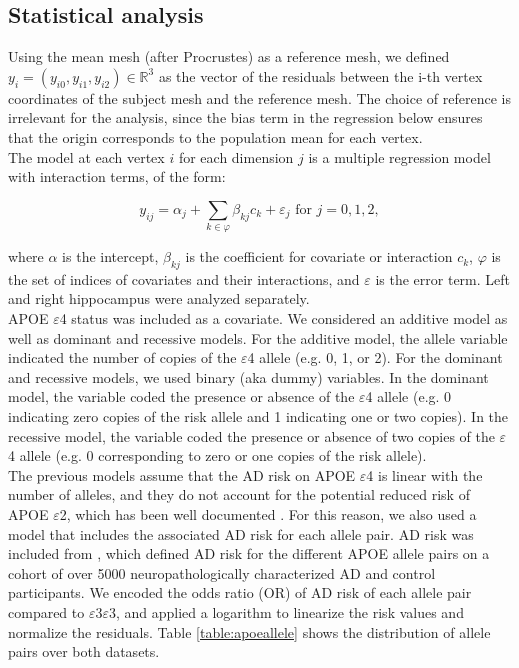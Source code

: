 \subsection{Statistical analysis}
\label{subsec:stat}

Using the mean mesh (after Procrustes) as a reference mesh, we defined $y_i=(y_{i0}, y_{i1}, y_{i2}) \in \mathbb{R}^3$ as the vector of the residuals between the i-th vertex coordinates of the subject mesh and the reference mesh. The choice of reference is irrelevant for the analysis, since the bias term in the regression below ensures that the origin corresponds to the population mean for each vertex. \\

The model at each vertex $i$ for each dimension $j$ is a multiple regression model with interaction terms, of the form:

\begin{equation}
    y_{ij} = \alpha_{j} + \sum_{k \in \mathcal{\varphi}} \beta_{kj} c_k + \varepsilon_j \textrm{ for } j = {0, 1, 2},
\end{equation} 

where $\alpha$ is the intercept, $\beta_{kj}$ is the coefficient for covariate or interaction $c_k$, $\mathcal{\varphi}$ is the set of indices of covariates and their interactions, and $\varepsilon$ is the error term. Left and right hippocampus were analyzed separately. \\ 

APOE $\varepsilon$4 status was included as a covariate. We considered an additive model as well as dominant and recessive models. For the additive model, the allele variable indicated the number of copies of the $\varepsilon$4 allele (e.g. 0, 1, or 2). For the dominant and recessive models, we used binary (aka dummy) variables. In the dominant model, the variable coded the presence or absence of the $\varepsilon$4 allele (e.g. 0 indicating zero copies of the risk allele and 1 indicating one or two copies). In the recessive model, the variable coded the presence or absence of two copies of the $\varepsilon$4 allele (e.g. 0 corresponding to zero or one copies of the risk allele). \\

The previous models assume that the AD risk on APOE $\varepsilon$4 is linear with the number of alleles, and they do not account for the potential reduced risk of APOE $\varepsilon$2, which has been well documented \cite{Genin2011,Liu2013a}. For this reason, we also used a model that includes the associated AD risk for each allele pair. AD risk was included from \cite{Reiman2020}, which defined AD risk for the different APOE allele pairs on a cohort of over 5000 neuropathologically characterized AD and control participants. We encoded the odds ratio (OR) of AD risk of each allele pair compared to $\varepsilon$3$\varepsilon$3, and applied a logarithm to linearize the risk values and normalize the residuals. Table \ref{table:apoeallele} shows the distribution of allele pairs over both datasets. \\

